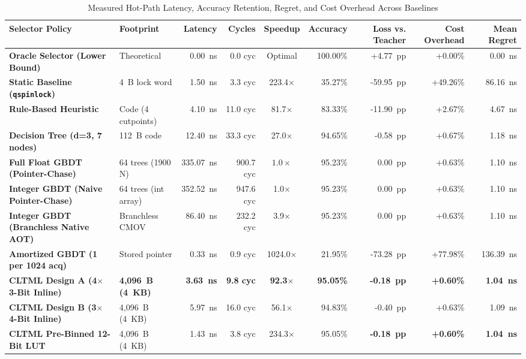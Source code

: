 \documentclass[conference]{IEEEtran}
\begin{document}
\begin{table}[t]
\centering
\caption{Measured Hot-Path Latency, Accuracy Retention, Regret, and Cost Overhead Across Baselines}
\label{tab:results}
\begin{tabular}{llrrcrrrr}
\toprule
\textbf{Selector Policy} & \textbf{Footprint} & \textbf{Latency} & \textbf{Cycles} & \textbf{Speedup} & \textbf{Accuracy} & \textbf{Loss vs. Teacher} & \textbf{Cost Overhead} & \textbf{Mean Regret} \\
\midrule
\textbf{Oracle Selector (Lower Bound)} & Theoretical & 0.00~ns & 0.0 cyc & Optimal & 100.00\% & +4.77~pp & +0.00\% & 0.00~ns \\
\textbf{Static Baseline (\texttt{qspinlock})} & 4~B lock word & 1.50~ns & 3.3 cyc & 223.4$\times$ & 35.27\% & -59.95~pp & +49.26\% & 86.16~ns \\
\textbf{Rule-Based Heuristic} & Code (4 cutpoints) & 4.10~ns & 11.0 cyc & 81.7$\times$ & 83.33\% & -11.90~pp & +2.67\% & 4.67~ns \\
\textbf{Decision Tree (d=3, 7 nodes)} & 112~B code & 12.40~ns & 33.3 cyc & 27.0$\times$ & 94.65\% & -0.58~pp & +0.67\% & 1.18~ns \\
\textbf{Full Float GBDT (Pointer-Chase)} & 64 trees (1900 N) & 335.07~ns & 900.7 cyc & $1.0\times$ & 95.23\% & 0.00~pp & +0.63\% & 1.10~ns \\
\textbf{Integer GBDT (Naive Pointer-Chase)} & 64 trees (int array) & 352.52~ns & 947.6 cyc & 1.0$\times$ & 95.23\% & 0.00~pp & +0.63\% & 1.10~ns \\
\textbf{Integer GBDT (Branchless Native AOT)} & Branchless CMOV & 86.40~ns & 232.2 cyc & 3.9$\times$ & 95.23\% & 0.00~pp & +0.63\% & 1.10~ns \\
\textbf{Amortized GBDT (1 per 1024 acq)} & Stored pointer & 0.33~ns & 0.9 cyc & 1024.0$\times$ & 21.95\% & -73.28~pp & +77.98\% & 136.39~ns \\
\textbf{CLTML Design A (4$\times$3-Bit Inline)} & \textbf{4,096~B (4~KB)} & \textbf{3.63~ns} & \textbf{9.8 cyc} & \textbf{92.3$\times$} & \textbf{95.05\%} & \textbf{-0.18~pp} & \textbf{+0.60\%} & \textbf{1.04~ns} \\
\textbf{CLTML Design B (3$\times$4-Bit Inline)} & 4,096~B (4~KB) & 5.97~ns & 16.0 cyc & 56.1$\times$ & 94.83\% & -0.40~pp & +0.63\% & 1.09~ns \\
\textbf{CLTML Pre-Binned 12-Bit LUT} & 4,096~B (4~KB) & 1.43~ns & 3.8 cyc & 234.3$\times$ & 95.05\% & \textbf{-0.18~pp} & \textbf{+0.60\%} & \textbf{1.04~ns} \\
\bottomrule
\end{tabular}
\end{table}
\end{document}
